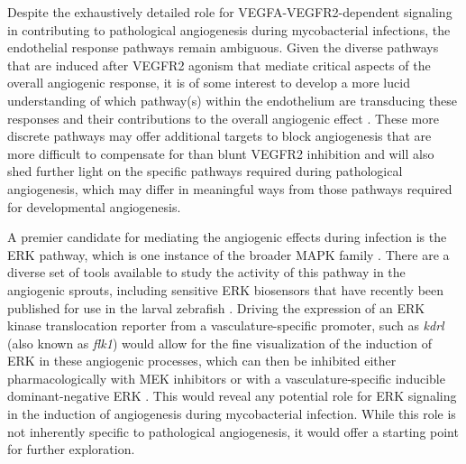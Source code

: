 Despite the exhaustively detailed role for VEGFA\hyp{}VEGFR2\hyp{}dependent signaling in contributing to pathological angiogenesis during mycobacterial infections, the endothelial response pathways remain ambiguous. Given the diverse pathways that are induced after VEGFR2 agonism that mediate critical aspects of the overall angiogenic response, it is of some interest to develop a more lucid understanding of which pathway(s) within the endothelium are transducing these responses and their contributions to the overall angiogenic effect \citep{Abhinand2016}. These more discrete pathways may offer additional targets to block angiogenesis that are more difficult to compensate for than blunt VEGFR2 inhibition and will also shed further light on the specific pathways required during pathological angiogenesis, which may differ in meaningful ways from those pathways required for developmental angiogenesis.

A premier candidate for mediating the angiogenic effects during infection is the ERK pathway, which is one instance of the broader MAPK family \citep{Shibuya2006, Wang2020b}. There are a diverse set of tools available to study the activity of this pathway in the angiogenic sprouts, including sensitive ERK biosensors that have recently been published for use in the larval zebrafish \citep{DeSimone2021}. Driving the expression of an ERK kinase translocation reporter from a vasculature\hyp{}specific promoter, such as \textit{kdrl} (also known as \textit{flk1}) would allow for the fine visualization of the induction of ERK in these angiogenic processes, which can then be inhibited either pharmacologically with MEK inhibitors or with a vasculature\hyp{}specific inducible dominant\hyp{}negative ERK \citep{Izumi2001}. This would reveal any potential role for ERK signaling in the induction of angiogenesis during mycobacterial infection. While this role is not inherently specific to pathological angiogenesis, it would offer a starting point for further exploration. 

